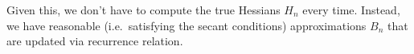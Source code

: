 \documentclass[12pt]{article}
\numberwithin{equation}{section} %
\theoremstyle{plain}
\theoremstyle{definition}
\theoremstyle{remark}
\begin{document}
Given this, we don't have to compute the true Hessians $H_n$ every time.
Instead, we have reasonable (i.e.\ satisfying the secant conditions)
approximations $B_n$ that are updated via recurrence relation.








\end{document}
